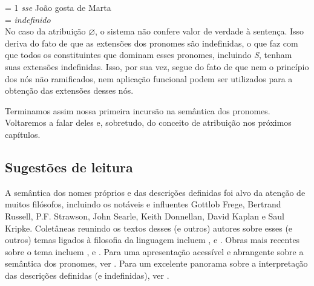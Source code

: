 \n{} = 1 \textit{sse} João gosta de Marta\\

\n{}\gvaz = \textit{indefinido}\\

\n No caso da atribuição $\varnothing$, o sistema não confere
valor de verdade à sentença. Isso deriva do fato de que as
extensões dos pronomes são indefinidas, o que faz com que todos os
constituintes que dominam esses pronomes, incluindo \textit{S},
tenham suas extensões indefinidas. Isso, por sua vez, segue do
fato de que nem o princípio dos nós não ramificados, nem aplicação
funcional podem ser utilizados para a obtenção das extensões
desses nós.

Terminamos assim nossa primeira incursão na semântica dos
pronomes. Voltaremos a falar deles e, sobretudo, do conceito de
atribuição nos próximos capítulos.

\bigskip

\begin{tcolorbox}[parbox=false,boxrule=0pt,sharp corners,breakable]

\section*{Sugestões de leitura}

\n  A semântica dos nomes próprios e das descrições definidas foi alvo da atenção de muitos filósofos, incluindo os notáveis e influentes Gottlob Frege, Bertrand Russell, P.F. Strawson, John Searle, Keith Donnellan, David Kaplan e Saul Kripke. Coletâneas reunindo os textos desses (e outros) autores sobre esses (e outros) temas ligados à filosofia da linguagem incluem \cite{ostertag98}, \cite{martinich01} e \cite{ludlow98}. Obras mais recentes sobre o tema incluem \cite{abbott10}, \cite{elbourne13} e \cite{neale90}. Para uma apresentação acessível e abrangente sobre a semântica dos pronomes, ver \cite{buring05}. Para um excelente panorama sobre a interpretação das descrições definidas (e indefinidas), ver \cite{heim91}.

\end{tcolorbox}

\bigskip

